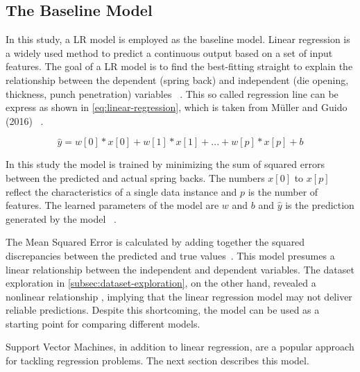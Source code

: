 
\subsection{The Baseline Model}\label{subsec:regression-models}
In this study, a \ac{LR} model is employed as the baseline model.
Linear regression is a widely used method to predict a continuous output based on a set
of input features.
The goal of a \ac{LR} model is to find the best-fitting straight to explain the relationship between the dependent
(spring back) and independent (die opening, thickness, punch penetration)
variables
~\cite[pp. 45--46]{muller2016introduction}.
This so called regression line can be express as shown in \cref{eq:linear-regression}, which is taken from
Müller and Guido (2016)
~\cite[p. 45]{muller2016introduction}.

\begin{tcolorbox}[arc=0pt,boxrule=0.5pt]
    \begin{equation}
        \hat{y} = w[0] * x[0] + w[1] * x[1] + ... + w[p] * x[p] + b
        \label{eq:linear-regression}
    \end{equation}
\end{tcolorbox}

In this study the model is trained by minimizing the sum of squared errors between the predicted and actual spring
backs.
The numbers $x[0]$ to $x[p]$ reflect the characteristics of a single data instance and  $p$ is the number of features.
The learned parameters of the model are $w$ and $b$ and $\hat{y}$  is the prediction generated by the model
~\cite[p. 45]{muller2016introduction}.

The Mean Squared Error is calculated by adding together the squared discrepancies between the predicted and true
values~\cite[pp. 47--68]{muller2016introduction}.
This model presumes a linear relationship between the independent and dependent variables.
The dataset exploration in \cref{subsec:dataset-exploration}, on the other hand, revealed a nonlinear relationship
, implying that the linear regression model may not deliver reliable predictions.
Despite this shortcoming, the model can be used as a starting point for comparing different models.

Support Vector Machines, in addition to linear regression, are a popular approach for tackling regression problems.
The next section describes this model.


